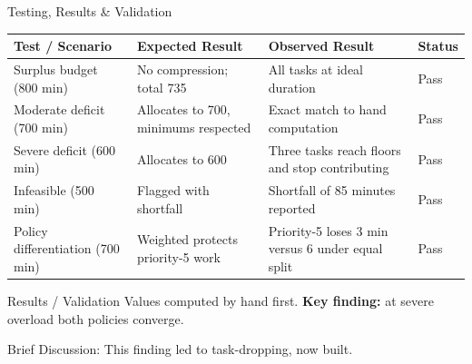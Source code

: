 \documentclass[aspectratio=169,11pt]{beamer}
\newcommand{\smallnote}[1]{%
\vspace{0.08cm}
{\scriptsize\color{GEUGrey}#1}
}
\begin{document}
\begin{frame}{Testing, Results \& Validation}

\scriptsize

\begin{center}

\renewcommand{\arraystretch}{1.3}

\begin{tabularx}{.96\textwidth}
{@{}p{2.6cm}X X p{1.0cm}@{}}

\toprule
Test / Scenario &
Expected Result &
Observed Result &
Status\\
\midrule

Surplus budget (800 min) &
No compression; total 735 &
All tasks at ideal duration &
Pass\\

Moderate deficit (700 min) &
Allocates to 700, minimums respected &
Exact match to hand computation &
Pass\\

Severe deficit (600 min) &
Allocates to 600 &
Three tasks reach floors and stop contributing &
Pass\\

Infeasible (500 min) &
Flagged with shortfall &
Shortfall of 85 minutes reported &
Pass\\

Policy differentiation (700 min) &
Weighted protects priority-5 work &
Priority-5 loses 3 min versus 6 under equal split &
Pass\\

\bottomrule

\end{tabularx}

\end{center}

\vspace{2mm}

\begin{block}{Results / Validation}
\scriptsize
Values computed by hand first. \textbf{Key finding:} at severe overload both policies converge.
\end{block}

\smallnote{
Brief Discussion: This finding led to task-dropping, now built.
}

\end{frame}
\end{document}
